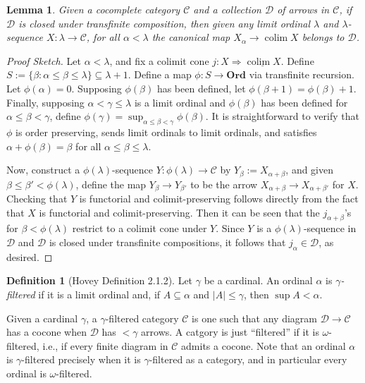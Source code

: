 \documentclass{amsart}
\theoremstyle{plain}
\newtheorem{lemma}[theorem]{Lemma}
\theoremstyle{definition}
\newtheorem{definition}[theorem]{Definition}
\newcommand{\Ord}{\mbf{Ord}}
\newcommand{\sseq}{\subseteq}
\newcommand{\0}{\mathbf{0}}
\newcommand{\cC}{\mathcal C}
\newcommand{\cD}{\mathcal D}
\newcommand{\mbf}[1]{\mathbf{#1}}
\newcommand{\ul}{\underline}
\renewcommand{\(}{\left(}
\renewcommand{\)}{\right)}
\DeclareMathOperator*{\colim}{colim}
\begin{document}
\begin{lemma}\label{stronger_characterization_of_closure_under_transfinite_composition}
  Given a cocomplete category $\cC$ and a collection $\cD$ of arrows in $\cC$, if $\cD$ is closed under transfinite composition, then given any limit ordinal $\lambda$ and $\lambda$-sequence $X:\lambda\to\cC$, for all $\alpha<\lambda$ the canonical map $X_\alpha\to\colim X$ belongs to $\cD$.
\end{lemma}
\begin{proof}[Proof Sketch]
  Let $\alpha<\lambda$, and fix a colimit cone $j:X\Rightarrow\ul{\colim X}$. Define $S:=\{\beta:\alpha\leq\beta\leq\lambda\}\sseq\lambda+1$. Define a map $\phi:S\to\Ord$ via transfinite recursion. Let $\phi(\alpha)=0$. Supposing $\phi(\beta)$ has been defined, let $\phi(\beta+1)=\phi(\beta)+1$. Finally, supposing $\alpha<\gamma\leq\lambda$ is a limit ordinal and $\phi(\beta)$ has been defined for $\alpha\leq\beta<\gamma$, define $\phi(\gamma)=\sup_{\alpha\leq\beta<\gamma}\phi(\beta)$. It is straightforward to verify that $\phi$ is order preserving, sends limit ordinals to limit ordinals, and satisfies $\alpha+\phi(\beta)=\beta$ for all $\alpha\leq\beta\leq\lambda$.
  
  Now, construct a $\phi(\lambda)$-sequence $Y:\phi(\lambda)\to\cC$ by $Y_\beta:=X_{\alpha+\beta}$, and given $\beta\leq\beta'<\phi(\lambda)$, define the map $Y_\beta\to Y_{\beta'}$ to be the arrow $X_{\alpha+\beta}\to X_{\alpha+\beta'}$ for $X$. Checking that $Y$ is functorial and colimit-preserving follows directly from the fact that $X$ is functorial and colimit-preserving. Then it can be seen that the $j_{\alpha+\beta}$'s for $\beta<\phi(\lambda)$ restrict to a colimit cone under $Y$. Since $Y$ is a $\phi(\lambda)$-sequence in $\cD$ and $\cD$ is closed under transfinite compositions, it follows that $j_\alpha\in\cD$, as desired.
\end{proof}

\begin{definition}[Hovey Definition 2.1.2]
  Let $\gamma$ be a cardinal. An ordinal $\alpha$ is \textit{$\gamma$-filtered} if it is a limit ordinal and, if $A\sseq\alpha$ and $|A|\leq\gamma$, then $\sup A<\alpha$.
\end{definition}

Given a cardinal $\gamma$, a $\gamma$-filtered category $\cC$ is one such that any diagram $\cD\to\cC$ has a cocone when $\cD$ has $<\gamma$ arrows. A catgory is just ``filtered'' if it is $\omega$-filtered, i.e., if every finite diagram in $\cC$ admits a cocone. Note that an ordinal $\alpha$ is $\gamma$-filtered precisely when it is $\gamma$-filtered as a category, and in particular every ordinal is $\omega$-filtered.
\end{document}
